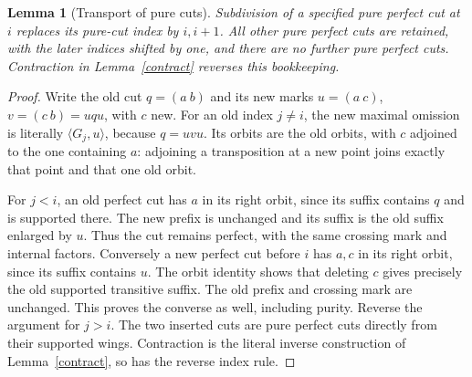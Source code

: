 \documentclass[11pt,a4paper]{article}
\newtheorem{lemma}{Lemma}\newtheorem{theorem}[lemma]{Theorem}
\newcommand{\gen}[1]{\langle#1\rangle}
\begin{document}
\begin{lemma}[Transport of pure cuts]\label{transport}
Subdivision of a specified pure perfect cut at $i$ replaces its
pure-cut index by $i,i+1$. All other pure perfect cuts are retained,
with the later indices shifted by one, and there are no further
pure perfect cuts. Contraction in Lemma~\ref{contract} reverses this
bookkeeping.
\end{lemma}
\begin{proof}
Write the old cut $q=(a\ b)$ and its new marks $u=(a\ c)$,
$v=(c\ b)=uqu$, with $c$ new. For an old index $j\ne i$,
the new maximal omission is literally $\gen{G_j,u}$, because
$q=uvu$. Its orbits are the old orbits, with $c$ adjoined to the
one containing $a$: adjoining a transposition at a new point joins
exactly that point and that one old orbit.

For $j<i$, an old perfect cut has $a$ in its right orbit, since
its suffix contains $q$ and is supported there. The new prefix is
unchanged and its suffix is the old suffix enlarged by $u$. Thus
the cut remains perfect, with the same crossing mark and internal
factors. Conversely a new perfect cut before $i$ has $a,c$ in its
right orbit, since its suffix contains $u$. The orbit identity
shows that deleting $c$ gives precisely the old supported transitive
suffix. The old prefix and crossing mark are unchanged. This proves
the converse as well, including purity. Reverse the argument for
$j>i$. The two inserted cuts are pure perfect cuts directly from
their supported wings. Contraction is the literal inverse
construction of Lemma~\ref{contract}, so has the reverse index rule.
\end{proof}
\end{document}
